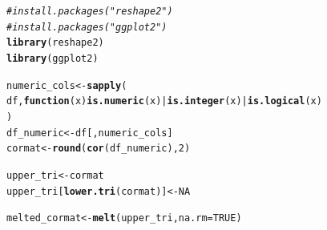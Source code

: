 \documentclass{article}\usepackage[]{graphicx}\usepackage[]{xcolor}
\makeatletter
\newcommand{\hlnum}[1]{\textcolor[rgb]{0.686,0.059,0.569}{#1}}%
\newcommand{\hlcom}[1]{\textcolor[rgb]{0.678,0.584,0.686}{\textit{#1}}}%
\newcommand{\hlopt}[1]{\textcolor[rgb]{0,0,0}{#1}}%
\newcommand{\hldef}[1]{\textcolor[rgb]{0.345,0.345,0.345}{#1}}%
\newcommand{\hlkwa}[1]{\textcolor[rgb]{0.161,0.373,0.58}{\textbf{#1}}}%
\newcommand{\hlkwb}[1]{\textcolor[rgb]{0.69,0.353,0.396}{#1}}%
\newcommand{\hlkwc}[1]{\textcolor[rgb]{0.333,0.667,0.333}{#1}}%
\newcommand{\hlkwd}[1]{\textcolor[rgb]{0.737,0.353,0.396}{\textbf{#1}}}%
\newenvironment{kframe}{%
 \def\at@end@of@kframe{}%
 \ifinner\ifhmode%
  \def\at@end@of@kframe{\end{minipage}}%
  \begin{minipage}{\columnwidth}%
 \fi\fi%
 \def\FrameCommand##1{\hskip\@totalleftmargin \hskip-\fboxsep
 \colorbox{shadecolor}{##1}\hskip-\fboxsep
     \hskip-\linewidth \hskip-\@totalleftmargin \hskip\columnwidth}%
 \MakeFramed {\advance\hsize-\width
   \@totalleftmargin\z@ \linewidth\hsize
   \@setminipage}}%
 {\par\unskip\endMakeFramed%
 \at@end@of@kframe}
\newenvironment{knitrout}{}{} %
\makeatother
\begin{document}
\begin{knitrout}
\color{fgcolor}\begin{kframe}
\begin{alltt}
\hlcom{# install.packages("reshape2")}
\hlcom{# install.packages("ggplot2")}
\hlkwd{library}\hldef{(reshape2)}
\hlkwd{library}\hldef{(ggplot2)}

\hldef{numeric_cols} \hlkwb{<-} \hlkwd{sapply}\hldef{(}
  \hldef{df,} \hlkwa{function}\hldef{(}\hlkwc{x}\hldef{)} \hlkwd{is.numeric}\hldef{(x)} \hlopt{|} \hlkwd{is.integer}\hldef{(x)} \hlopt{|} \hlkwd{is.logical}\hldef{(x)}
\hldef{)}
\hldef{df_numeric} \hlkwb{<-} \hldef{df[, numeric_cols]}
\hldef{cormat} \hlkwb{<-} \hlkwd{round}\hldef{(}\hlkwd{cor}\hldef{(df_numeric),}\hlnum{2}\hldef{)}

\hldef{upper_tri} \hlkwb{<-} \hldef{cormat}
\hldef{upper_tri[}\hlkwd{lower.tri}\hldef{(cormat)]} \hlkwb{<-} \hlnum{NA}

\hldef{melted_cormat} \hlkwb{<-} \hlkwd{melt}\hldef{(upper_tri,} \hlkwc{na.rm} \hldef{=} \hlnum{TRUE}\hldef{)}


\end{alltt}
\end{kframe}
\end{knitrout}
\end{document}
